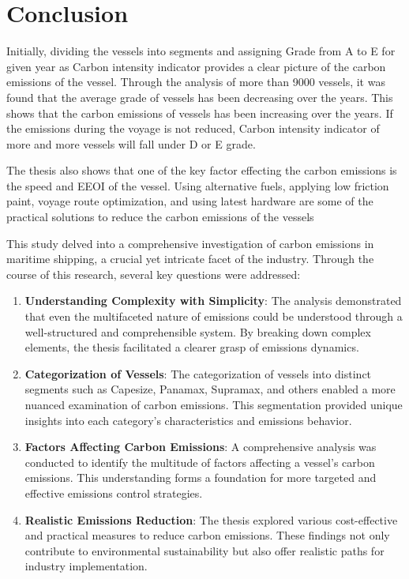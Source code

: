 \chapter{Conclusion}

Initially, dividing the vessels into segments and assigning Grade from A to E for given year as Carbon intensity indicator provides a clear picture of the carbon emissions of the vessel.
Through the analysis of more than 9000 vessels, it was found that the average grade of vessels has been decreasing over the years. 
This shows that the carbon emissions of vessels has been increasing over the years.
If the emissions during the voyage is not reduced, Carbon intensity indicator of more and more vessels will fall under D or E grade. 

The thesis also shows that one of the key factor effecting the carbon emissions is the speed and EEOI of the vessel.
Using alternative fuels, applying low friction paint, voyage route optimization, and using latest hardware are some of the practical solutions to reduce the carbon emissions of the vessels


This study delved into a comprehensive investigation of carbon emissions in maritime shipping, a crucial yet intricate facet of the industry. Through the course of this research, several key questions were addressed:

\begin{enumerate}
    \item \textbf{Understanding Complexity with Simplicity}: The analysis demonstrated that even the multifaceted nature of emissions could be understood through a well-structured and comprehensible system. By breaking down complex elements, the thesis facilitated a clearer grasp of emissions dynamics.
    \item \textbf{Categorization of Vessels}: The categorization of vessels into distinct segments such as Capesize, Panamax, Supramax, and others enabled a more nuanced examination of carbon emissions. This segmentation provided unique insights into each category's characteristics and emissions behavior.
    \item \textbf{Factors Affecting Carbon Emissions}: A comprehensive analysis was conducted to identify the multitude of factors affecting a vessel's carbon emissions. This understanding forms a foundation for more targeted and effective emissions control strategies.
    \item \textbf{Realistic Emissions Reduction}: The thesis explored various cost-effective and practical measures to reduce carbon emissions. These findings not only contribute to environmental sustainability but also offer realistic paths for industry implementation.
\end{enumerate}

